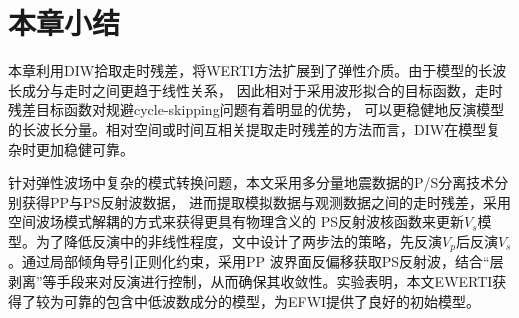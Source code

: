 \section{本章小结}
本章利用DIW拾取走时残差，将WERTI方法扩展到了弹性介质。由于模型的长波长成分与走时之间更趋于线性关系，
因此相对于采用波形拟合的目标函数，走时残差目标函数对规避cycle-skipping问题有着明显的优势，
可以更稳健地反演模型的长波长分量。相对空间或时间互相关提取走时残差的方法而言，DIW在模型复杂时更加稳健可靠。

针对弹性波场中复杂的模式转换问题，本文采用多分量地震数据的P/S分离技术分别获得PP与PS反射波数据，
进而提取模拟数据与观测数据之间的走时残差，采用空间波场模式解耦的方式来获得更具有物理含义的
PS反射波核函数来更新$V_s$模型。为了降低反演中的非线性程度，文中设计了两步法的策略，先反演$V_p$后反演$V_s$。通过局部倾角导引正则化约束，采用PP
波界面反偏移获取PS反射波，结合“层剥离”等手段来对反演进行控制，从而确保其收敛性。实验表明，本文EWERTI获得了较为可靠的包含中低波数成分的模型，为EFWI提供了良好的初始模型。
